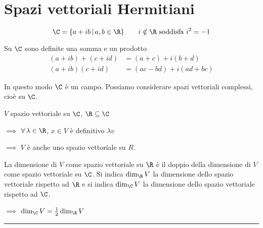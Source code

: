 


\section{Spazi vettoriali Hermitiani}

\[
    \C =\{a+ib\,|\, a, b \in \R\}\qquad i \notin \R\text{ soddisfa }i^{2}=-1
\]

Su $ \C $ sono definite una somma e un prodotto \begin{align*}
    (a+ib)+(c+id)&=(a+c)+i(b+d)\\
    (a+ib)(c+id)&=(ac-bd)+i(ad+bc)
\end{align*}

In questo modo $ \C $ è un campo. Possiamo considerare spazi vettoriali complessi, cioè su $ \C $.


$ V $ spazio vettoriale su $ \C $, $ \R \subseteq \C $ 

$\implies$ $ \forall\, \lambda \in \R $, $ x \in V $ è definitivo $ \lambda v $ 

$\implies$ $ V $ è anche uno spazio vettoriale su $ R $. 

La dimensione di $ V $ come spazio vettoriale su $ \R $ è il doppio della dimensione di $ V $ come spazio vettoriale su $ \C $. Si indica $ \dim_{\R} V $ la dimensione dello spazio vettoriale rispetto ad $ \R $ e si indica $ \dim_{\C} V $ la dimensione dello spazio vettoriale rispetto ad $ \C $. 

$\implies$ $ \dim_{\C} V = \frac{1}{2}\dim_{\R} V $

\rule{7em}{.4pt}

